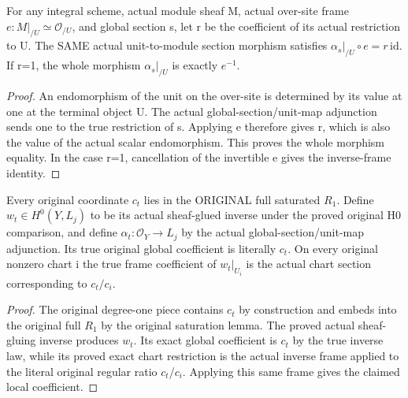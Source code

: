 \begin{lemma}
\label{lem:seven-native-whole-section-map-frame}
\leanok
For any integral scheme, actual module sheaf M, actual over-site frame
$e:M|_{/U}\simeq\mathcal O_{/U}$, and global section s, let r be the
coefficient of its actual restriction to U. The SAME actual unit-to-module
section morphism satisfies $\alpha_s|_{/U}\circ e=r\,\mathrm{id}$.
If r=1, the whole morphism $\alpha_s|_{/U}$ is exactly $e^{-1}$.
\end{lemma}
\begin{proof}
An endomorphism of the unit on the over-site is determined by its value at
one at the terminal object U. The actual global-section/unit-map adjunction
sends one to the true restriction of s. Applying e therefore gives r,
which is also the value of the actual scalar endomorphism. This proves the
whole morphism equality. In the case r=1, cancellation of the invertible
e gives the inverse-frame identity.
\end{proof}

\begin{definition}
\label{def:seven-native-coordinate-global-sections}
\leanok
Every original coordinate $c_t$ lies in the ORIGINAL full saturated $R_1$.
Define $w_t\in H^0(Y,L_j)$ to be its actual sheaf-glued inverse under the
proved original H0 comparison, and define $\alpha_t:\mathcal O_Y\to L_j$
by the actual global-section/unit-map adjunction. Its true original global
coefficient is literally $c_t$. On every original nonzero chart i the true
frame coefficient of $w_t|_{U_i}$ is the actual chart section corresponding
to $c_t/c_i$.
\end{definition}
\begin{proof}
The original degree-one piece contains $c_t$ by construction and embeds into
the original full $R_1$ by the original saturation lemma. The proved
actual sheaf-gluing inverse produces $w_t$. Its exact global coefficient is
$c_t$ by the true inverse law, while its proved exact chart restriction is the
actual inverse frame applied to the literal original regular ratio $c_t$/$c_i$.
Applying this same frame gives the claimed local coefficient.
\end{proof}

